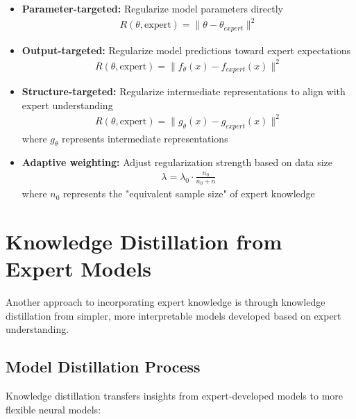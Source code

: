 \begin{itemize}
    \item \textbf{Parameter-targeted:} Regularize model parameters directly
    \begin{align}
        R(\theta, \text{expert}) = \|\theta - \theta_{expert}\|^2
    \end{align}

    \item \textbf{Output-targeted:} Regularize model predictions toward expert expectations
    \begin{align}
        R(\theta, \text{expert}) = \|f_\theta(x) - f_{expert}(x)\|^2
    \end{align}

    \item \textbf{Structure-targeted:} Regularize intermediate representations to align with expert understanding
    \begin{align}
        R(\theta, \text{expert}) = \|g_\theta(x) - g_{expert}(x)\|^2
    \end{align}
    where $g_\theta$ represents intermediate representations

    \item \textbf{Adaptive weighting:} Adjust regularization strength based on data size
    \begin{align}
        \lambda = \lambda_0 \cdot \frac{n_0}{n_0 + n}
    \end{align}
    where $n_0$ represents the "equivalent sample size" of expert knowledge
\end{itemize}

\section{Knowledge Distillation from Expert Models}

Another approach to incorporating expert knowledge is through knowledge distillation from simpler, more interpretable models developed based on expert understanding.

\subsection{Model Distillation Process}

Knowledge distillation transfers insights from expert-developed models to more flexible neural models:


